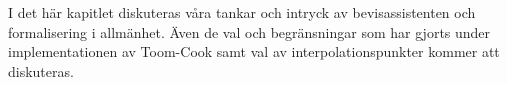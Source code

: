 I det här kapitlet diskuteras våra tankar och intryck av bevisassistenten
\coq{} och formalisering i allmänhet. Även de val och begränsningar som har
gjorts under implementationen av Toom-Cook samt val av interpolationspunkter
kommer att diskuteras.

